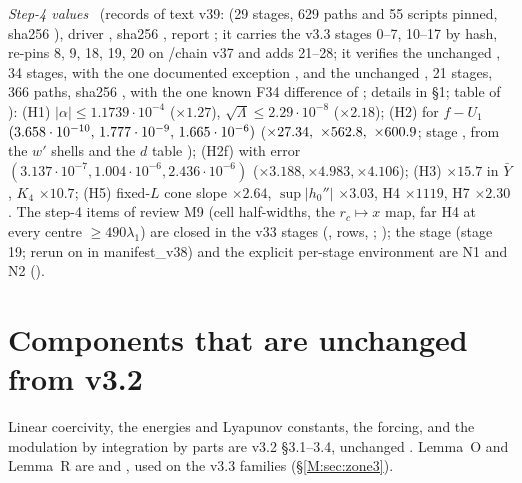\documentclass[11pt]{article}
\begin{document}
\noindent\emph{Step-4 values} \tC\ (records of text v39:  (29 stages, 629 paths and 55 scripts pinned, sha256 ), driver , sha256 , report ; it carries the v3.3 stages 0--7, 10--17 by hash, re-pins 8, 9, 18, 19, 20 on /chain v37 and adds 21--28; it verifies the unchanged , 34 stages, with the one documented exception , and the unchanged , 21 stages, 366 paths, sha256 , with the one known F34 difference of ; details in  \S1; table of ): (H1) $|\alpha|\le1.1739\cdot10^{-4}$ ($\times1.27$), $\sqrt\Lambda\le2.29\cdot10^{-8}$ ($\times2.18$); (H2) for $f-U_1$ $(3.658\cdot10^{-10},\,1.777\cdot10^{-9},\,1.665\cdot10^{-6})$ ($\times27.34,\ \times562.8,\ \times600.9$; stage , from the $w'$ shells and the $d$ table ); (H2f) with error $(3.137\cdot10^{-7},1.004\cdot10^{-6},2.436\cdot10^{-6})$ ($\times3.188,\times4.983,\times4.106$); (H3) $\times15.7$ in $\bar Y$, $K_4$ $\times10.7$; (H5) fixed-$L$ cone slope $\times2.64$, $\sup|h_0''|$ $\times3.03$, H4 $\times1119$, H7 $\times2.30$. The step-4 items of review M9 (cell half-widths, the $r_c\mapsto x$ map, far H4 at every centre $\ge490\lambda_1$) are closed in the v33 stages (,  rows, ; ); the stage  (stage 19; rerun on  in manifest\_v38) and the explicit per-stage environment are N1 and N2 ().

\section{Components that are unchanged from v3.2}\label{M:sec:unchanged}
Linear coercivity, the energies and Lyapunov constants, the forcing, and the modulation by integration by parts are v3.2 \S3.1--3.4, unchanged \tC. Lemma~O and Lemma~R are  and , used on the v3.3 families (\S\ref{M:sec:zone3}).
\end{document}
